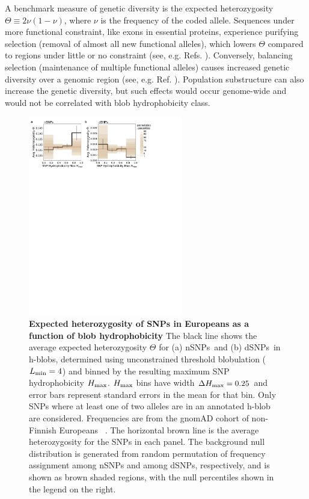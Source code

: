 \documentclass[9pt,twocolumn,twoside,lineno]{pnas-new}
\newcommand{\aucomment}[1]{}
\newcommand{\dSNPs}{dSNPs~}
\newcommand{\nSNPs}{nSNPs~}
\newcommand{\cmax}{H_{\rm max}}
\newcommand{\het}{\Theta}
\newcommand{\Lmin}{L_{\rm min}}
\begin{document}
A benchmark measure of genetic diversity is the expected heterozygosity $\het \equiv 2\nu(1-\nu)$, where $\nu$ is the frequency of the coded allele. Sequences under more functional constraint, like exons in essential proteins, experience purifying selection (removal of almost all new functional alleles), which lowers $\het$ compared to regions under little or no constraint (see, e.g. Refs. \cite{Dickerson1971,Charlesworth1993,Sunyaev2000,Siepel2005,Somel2013}). Conversely, balancing selection (maintenance of multiple functional alleles) causes increased genetic diversity over a genomic region (see, e.g. Ref. \cite{Llaurens2017}). Population substructure can also increase the genetic diversity, but such effects would occur genome-wide and would not be correlated with blob hydrophobicity class.  

\begin{figure}
\includegraphics[width=0.6\textwidth]{fig3.pdf}
\caption{{\bf Expected heterozygosity of SNPs in Europeans as a function of blob hydrophobicity} The black line shows the average expected heterozygosity $\het$ for (a) \nSNPs and (b) \dSNPs in h-blobs, determined using unconstrained threshold blobulation ($\Lmin=4$) and binned by the resulting maximum SNP hydrophobicity $\cmax$. $\cmax$ bins have width $\Delta \cmax=0.25$ and error bars represent standard errors in the mean for that bin. Only SNPs where at least one of two alleles are in an annotated h-blob are considered. Frequencies are  from the gnomAD cohort of non-Finnish Europeans~\cite{Karczewski2021} . The horizontal brown line is the average heterozygosity for the SNPs in each panel.
The background null distribution is generated from random permutation of frequency assignment among nSNPs and among dSNPs, respectively, and is shown as brown shaded regions, with the null percentiles shown in the legend on the right.\aucomment{This figure has been updated for readability, same data as original figure} }
\label{fig:het_v_hydromax} 
\end{figure}
\end{document}
